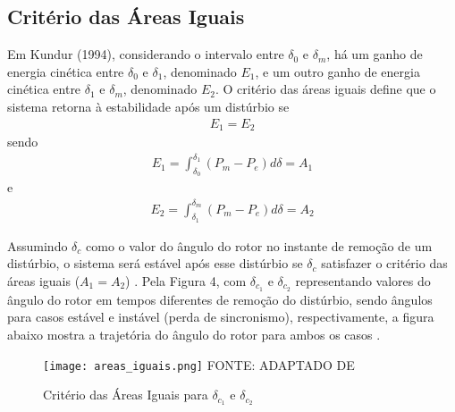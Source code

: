 \documentclass[12pt,oneside,a4paper,chapter=TITLE,section=TITLE,sumario=tradicional,english,brazil]{abntex2}
\begin{document}
\subsection{Critério das Áreas Iguais}
Em Kundur (1994), considerando o intervalo entre $\delta_{0}$ e $\delta_{m}$, há um ganho de energia cinética entre $\delta_{0}$ e $\delta_{1}$, denominado $E_{1}$, e um outro ganho de energia cinética entre $\delta_{1}$ e $\delta_{m}$, denominado $E_{2}$. O critério das áreas iguais \cite{kundur1994} define que o sistema retorna à estabilidade após um distúrbio se 
\begin{gather}
E_{1}=E_{2}
\end{gather}
sendo 
\begin{gather}
E_{1}=\int_{\delta_{0}}^{\delta_{1}} (P_{m} - P_{e}) d\delta=A_{1}
\end{gather}
e
\begin{gather}
E_{2}=\int_{\delta_{1}}^{\delta_{m}} (P_{m} - P_{e}) d\delta=A_{2}
\end{gather}
\par 
Assumindo $\delta_{c}$ como o valor do ângulo do rotor no instante de remoção de um distúrbio, o sistema será estável após esse distúrbio se $\delta_{c}$ satisfazer o critério das áreas iguais ($A_{1} = A_{2}$) \cite{kundur1994}. Pela Figura 4, com $\delta_{c_{1}}$ e $\delta_{c_{2}}$ representando valores do ângulo do rotor em tempos diferentes de remoção do distúrbio, sendo ângulos para casos estável e instável (perda de sincronismo), respectivamente, a figura abaixo mostra a trajetória do ângulo do rotor para ambos os casos \cite{kundur1994}.
\begin{figure}[ht!]
\centering
\caption{Critério das Áreas Iguais para $\delta_{c_{1}}$ e $\delta_{c_{2}}$}
\texttt{[image: areas\_iguais.png]}
FONTE: ADAPTADO DE \cite{kundur1994}
\end{figure}
\newpage
\end{document}
